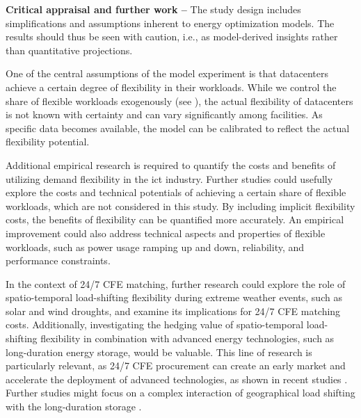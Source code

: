 \textbf{Critical appraisal and further work --} The study design includes simplifications and assumptions inherent to energy optimization models. The results should thus be seen with caution, i.e., as model-derived insights rather than quantitative projections.

One of the central assumptions of the model experiment is that datacenters achieve a certain degree of flexibility in their workloads. While we control the share of flexible workloads exogenously (see ), the actual flexibility of datacenters is not known with certainty and can vary significantly among facilities.
As specific data becomes available, the model can be calibrated to reflect the actual flexibility potential.

Additional empirical research is required to quantify the costs and benefits of utilizing demand flexibility in the \gls{ict} industry.
Further studies could usefully explore the costs and technical potentials of achieving a certain share of flexible workloads, which are not considered in this study.
By including implicit flexibility costs, the benefits of flexibility can be quantified more accurately.
An empirical improvement could also address technical aspects and properties of flexible workloads, such as power usage ramping up and down, reliability, and performance constraints.

In the context of 24/7 CFE matching, further research could explore the role of spatio-temporal load-shifting flexibility during extreme weather events, such as solar and wind droughts, and examine its implications for 24/7 CFE matching costs. Additionally, investigating the hedging value of spatio-temporal load-shifting flexibility in combination with advanced energy technologies, such as long-duration energy storage, would be valuable. This line of research is particularly relevant, as 24/7 CFE procurement can create an early market and accelerate the deployment of advanced technologies, as shown in recent studies \cite{xu-247CFE-report,riepinMeansCostsSystemlevel2023}. Further studies might focus on a complex interaction of geographical load shifting with the long-duration storage \cite{riepinValueSpacetimeLoadshifting2023}.
